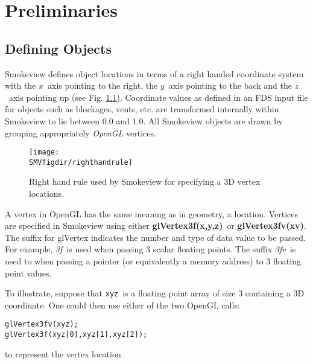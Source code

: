 \documentclass[11pt,twoside]{book}
\begin{document}
%
%

\chapter{Preliminaries}
\label{visoverview}
\section{Defining Objects} Smokeview defines object locations in terms of a right
handed coordinate system with the $x$~axis pointing to the right, the $y$~axis
pointing to the back and the $z$~axis pointing up (see Fig. \ref{figrighthand}).
Coordinate values as defined in an FDS input file for objects such as blockages,
vents, etc. are transformed internally within Smokeview to lie between 0.0 and 1.0.
All Smokeview objects are drawn by grouping appropriately {\em OpenGL} vertices.
\begin{figure}[bph]
\begin{center}
\texttt{[image: \\SMVfigdir/righthandrule]}
\end{center}
\caption{Right hand rule used by Smokeview for specifying a 3D vertex locations.}
\label{figrighthand}
\end{figure}

A vertex in OpenGL has the same meaning as in geometry, a
location. Vertices are specified in Smokeview using either {\bf
glVertex3f(x,y,z)}\ or {\bf glVertex3fv(xv)}.  The suffix for
glVertex indicates the number and type of data value to be passed.
For example, {\em 3f}\ is used when passing 3 scalar floating
points.  The suffix {\em 3fv}\ is used to when passing a pointer
(or equivalently a memory address) to 3 floating point  values.

To illustrate, suppose that {\tt xyz}\ is a floating point array
of size 3 containing a 3D coordinate.  One could then use either
of the two OpenGL calls:
\begin{lstlisting}
glVertex3fv(xyz);
glVertex3f(xyz[0],xyz[1],xyz[2]);
\end{lstlisting}
to represent the vertex location.
\end{document}
